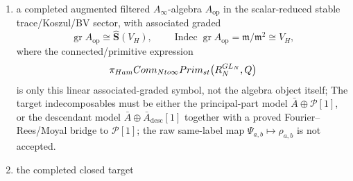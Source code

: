 \begin{defn}
\begin{enumerate}[label=(K\arabic*)]
      controls both windows, in which case \(A_{\psi,W}\),
      \(\Theta_{N,W}\), and \(\lambda_{\mathrm{LQT},W}\) are abbreviations
      for the specialization \(K,L\le W\).  The raw same-rank operation that deletes
      multicycle tensors is not a chain map, since
      \(d_{\mathrm{CE}}(\Theta_1(a)\wedge\Theta_1(b))\) has a
      single-cycle commutator component while deletion before the
      differential gives zero.  The finite-rank bridge is the
      separated-block stabilization zigzag: with
      \(B(K,L)=\max(K,L+2)\) and \(M=L\,B(K,L)\), let
      \(\beta_{M,K,L}\) be the normalized signed average over injections
      of connected Hopf factors into the \(L\) labeled diagonal
      \(B(K,L)\)-blocks, read separated blocks back by
      \(\alpha_{M,K,L}\), so that
      \(\alpha_{M,K,L}\beta_{M,K,L}=\operatorname{id}\), and use
      \[
        P^{\mathrm{sep}}_{M,K,L}
        =
        \beta_{M,K,L}P_{1\mathrm{cyc}}\alpha_{M,K,L}.
      \]
      A same-rank chain-homotopy bridge is blocked by the collision coderivation
      \[
        \Gamma_N=d_{\mathrm{same}}F_N-F_Nd_{\oplus},
        \qquad
        \Gamma_N(\Theta_1^N(a)\wedge\Theta_1^N(b))
        =
        \pm\Theta_1^N(ab-(-1)^{|a||b|}ba).
      \]
      The scalar quotient is a chain
      quotient only after killing the scalar-Koszul subcomplex
      \(\Theta_1(\psi)\mapsto\Theta_1(xy-yx)\), or after passing to
      homology; killing \(\Theta_1(\psi)\) alone is not a chain map;
    \item a completed augmented filtered \(A_\infty\)-algebra
      \(A_{\mathrm{op}}\) in the scalar-reduced stable trace/Koszul/BV
      sector, with associated graded
      \[
        \operatorname{gr}A_{\mathrm{op}}\cong
        \widehat{\mathbf S}(V_H),
        \qquad
        \operatorname{Indec}\operatorname{gr}A_{\mathrm{op}}
          =\mathfrak m/\mathfrak m^2\cong V_H,
      \]
      where the connected/primitive expression
      \[
        \pi_{Ham}
        Conn_{Nto\infty}
        Prim_{st}
        \bigl(R_N^{GL_N},Q\bigr)
      \]
      is only this linear associated-graded symbol, not the algebra object
      itself;
      The target indecomposables must be either the principal-part model
      \(\bar A\oplus\mathcal P[1]\), or the descendant model
      \(\bar A\oplus\bar A_{\mathrm{desc}}[1]\) together with a proved
      Fourier--Rees/Moyal bridge to \(\mathcal P[1]\); the raw same-label
      map \(\Psi_{a,b}\mapsto\rho_{a,b}\) is not accepted.
    \item the completed closed target

\end{enumerate}
\end{defn}
